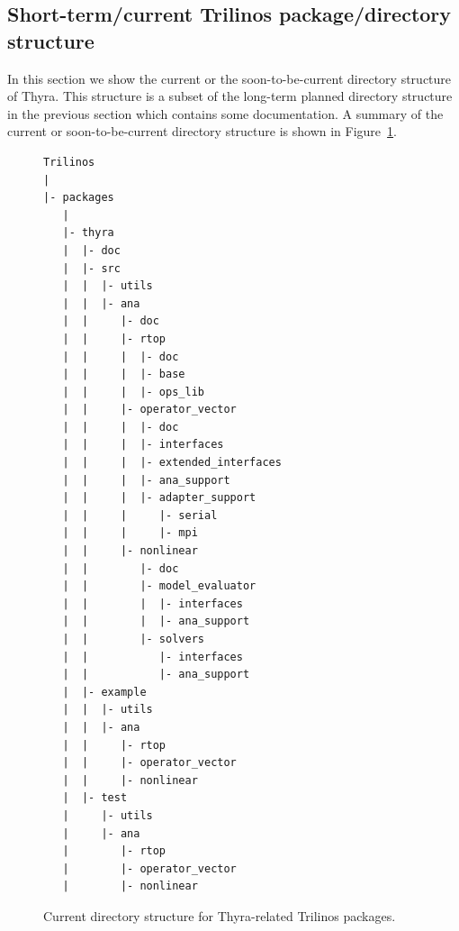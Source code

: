 \documentclass[pdf,ps2pdf,11pt]{SANDreport}
\begin{document}
%
\subsection{Short-term/current Trilinos package/directory structure}
%

In this section we show the current or the soon-to-be-current directory
structure of Thyra.  This structure is a subset of the long-term planned
directory structure in the previous section which contains some documentation.
A summary of the current or soon-to-be-current directory structure is shown in
Figure~\ref{thyra:fig:curr_dir_structure}.

\begin{figure}
\begin{verbatim}
Trilinos
|
|- packages
   |
   |- thyra
   |  |- doc
   |  |- src
   |  |  |- utils
   |  |  |- ana
   |  |     |- doc
   |  |     |- rtop
   |  |     |  |- doc
   |  |     |  |- base
   |  |     |  |- ops_lib
   |  |     |- operator_vector
   |  |     |  |- doc
   |  |     |  |- interfaces
   |  |     |  |- extended_interfaces
   |  |     |  |- ana_support
   |  |     |  |- adapter_support
   |  |     |     |- serial
   |  |     |     |- mpi
   |  |     |- nonlinear
   |  |        |- doc
   |  |        |- model_evaluator
   |  |        |  |- interfaces
   |  |        |  |- ana_support
   |  |        |- solvers
   |  |           |- interfaces
   |  |           |- ana_support
   |  |- example
   |  |  |- utils
   |  |  |- ana
   |  |     |- rtop
   |  |     |- operator_vector
   |  |     |- nonlinear
   |  |- test
   |     |- utils
   |     |- ana
   |        |- rtop
   |        |- operator_vector
   |        |- nonlinear
\end{verbatim}
\caption{
\label{thyra:fig:curr_dir_structure}
Current directory structure for Thyra-related Trilinos packages.
}
\end{figure}

\clearpage

%
\clearpage
%
%

%

\begin{SANDdistribution}
\end{SANDdistribution}
\end{document}
